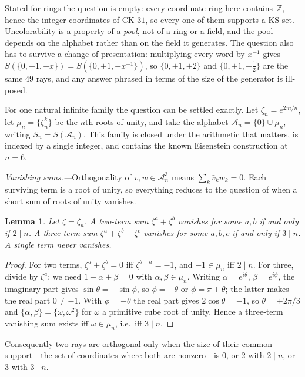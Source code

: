 \documentclass[twocolumn,prl,superscriptaddress,nofootinbib]{revtex4-2}
\newtheorem{lemma}[theorem]{Lemma}
\newcommand{\Z}{\mathbb{Z}}
\newcommand{\CK}{\mathrm{CK}\text{-}31}
\begin{document}
Stated for rings the question is empty: every coordinate ring here contains~$\Z$,
hence the integer coordinates of $\CK$, so every one of them supports a KS set.
Uncolorability is a property of a \emph{pool}, not of a ring or a field, and the
pool depends on the alphabet rather than on the field it generates.  The
question also has to survive a change of presentation: multiplying every word by
$x^{-1}$ gives $S(\{0,\pm1,\pm x\}) = S(\{0,\pm1,\pm x^{-1}\})$, so
$\{0,\pm1,\pm2\}$ and $\{0,\pm1,\pm\tfrac12\}$ are the same 49 rays, and any
answer phrased in terms of the size of the generator is ill-posed.

For one natural infinite family the question can be settled exactly.  Let
$\zeta_n = e^{2\pi i/n}$, let $\mu_n = \{\zeta_n^k\}$ be the $n$th roots of
unity, and take the alphabet $\mathcal{A}_n = \{0\}\cup\mu_n$, writing
$S_n = S(\mathcal{A}_n)$.  This family is closed under the arithmetic that
matters, is indexed by a single integer, and contains the known Eisenstein
construction at $n=6$.

\textit{Vanishing sums.---}Orthogonality of $v,w\in\mathcal{A}_n^3$ means
$\sum_k \bar v_k w_k = 0$.  Each surviving term is a root of unity, so everything
reduces to the question of when a short sum of roots of unity vanishes.

\begin{lemma}\label{lem:sums}
Let $\zeta=\zeta_n$.  A two-term sum $\zeta^a+\zeta^b$ vanishes for some $a,b$ if
and only if $2\mid n$.  A three-term sum $\zeta^a+\zeta^b+\zeta^c$ vanishes for
some $a,b,c$ if and only if $3\mid n$.  A single term never vanishes.
\end{lemma}

\begin{proof}
For two terms, $\zeta^a+\zeta^b=0$ iff $\zeta^{b-a}=-1$, and $-1\in\mu_n$ iff
$2\mid n$.  For three, divide by $\zeta^a$: we need $1+\alpha+\beta=0$ with
$\alpha,\beta\in\mu_n$.  Writing $\alpha=e^{i\theta}$, $\beta=e^{i\phi}$, the
imaginary part gives $\sin\theta=-\sin\phi$, so $\phi=-\theta$ or
$\phi=\pi+\theta$; the latter makes the real part $0\neq-1$.  With $\phi=-\theta$
the real part gives $2\cos\theta=-1$, so $\theta=\pm2\pi/3$ and
$\{\alpha,\beta\}=\{\omega,\omega^2\}$ for $\omega$ a primitive cube root of
unity.  Hence a three-term vanishing sum exists iff $\omega\in\mu_n$, i.e.\ iff
$3\mid n$.
\end{proof}

\noindent Consequently two rays are orthogonal only when the size of their common
support---the set of coordinates where both are nonzero---is $0$, or $2$ with
$2\mid n$, or $3$ with $3\mid n$.
\end{document}
